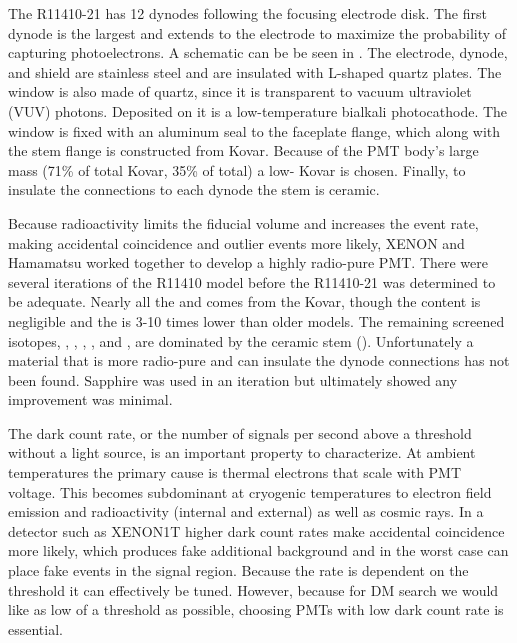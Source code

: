 The R11410-21 has 12 dynodes following the focusing electrode disk.  The first dynode is the largest and extends to the electrode to
maximize the probability of capturing photoelectrons.  A schematic can be be seen in .  The electrode,
dynode, and shield are stainless steel and are insulated with L-shaped quartz plates.  The window is
also made of quartz, since it is transparent to vacuum ultraviolet (VUV) photons.  Deposited on it is a low-temperature bialkali
photocathode.  The window is fixed with an aluminum seal to the faceplate flange, which along with the stem flange is constructed from
Kovar.  Because of the PMT body's large mass (71\% of total Kovar, 35\% of total) a low- Kovar is chosen.  Finally, to insulate
the connections to each dynode the stem is ceramic.

Because radioactivity limits the fiducial volume and increases the event rate, making accidental coincidence and outlier events more
likely, XENON and Hamamatsu worked together to develop a highly radio-pure PMT.  There were several iterations of the R11410 model before
the R11410-21 was determined to be adequate.  Nearly all the  and  comes from the Kovar, though the 
content is negligible and the  is 3-10 times lower than older models.  The remaining screened isotopes, ,
, , , and , are dominated by the ceramic stem ().  Unfortunately a
material that is more radio-pure and can insulate the dynode connections has not been found.  Sapphire was used in an iteration but
ultimately showed any improvement was minimal.

The dark count rate, or the number of signals per second above a threshold without a light source, is an important property to
characterize.  At ambient temperatures the primary cause is thermal electrons that scale with PMT voltage.  This becomes subdominant at
cryogenic temperatures to electron field emission and radioactivity (internal and external) as well as cosmic rays.  In a detector such
as XENON1T higher dark count rates make accidental coincidence more likely, which produces fake additional background and in the worst case
can place fake events in the signal region.  Because the rate is dependent on the threshold it can effectively be tuned.  However, because
for DM search we would like as low of a threshold as possible, choosing PMTs with low dark count rate is essential.

